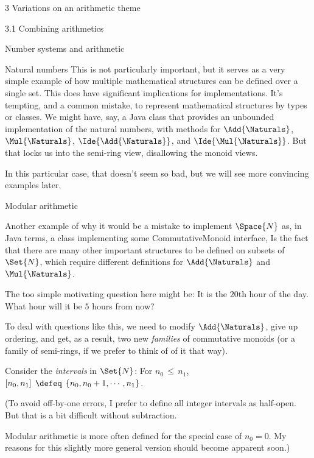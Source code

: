 \documentclass[12pt]{PalisadesLakesBook}
\begin{document}
\begin{plSection}{3 Variations on an arithmetic theme}
\begin{plSection}{3.1 Combining arithmetics}
\begin{plSection}{Number systems and arithmetic}
\begin{plSection}{Natural numbers}
This is not particularly important, but it serves as 
a very simple example
of how multiple mathematical structures can be defined
over a single set.
This does have significant implications for implementations.
It's tempting, and a common mistake, 
to represent mathematical structures by types or classes.
We might have, say, a Java class that provides an
unbounded implementation of the natural numbers,
with methods for $\Add{\Naturals}$, $\Mul{\Naturals}$, 
$\Ide{\Add{\Naturals}}$,
and $\Ide{\Mul{\Naturals}}$.
But that locks us into the semi-ring view,
disallowing the monoid views.

\TODO In this particular case, that doesn't seem so bad,
but we will see more convincing examples later.

\begin{plSection}{Modular arithmetic}

Another example of why it would be a mistake to implement
$\Space{N}$ as, in Java terms,
a class implementing some {\javaFont CommutativeMonoid} interface,
Is the fact that there are many other important structures
to be defined on subsets of $\Set{N}$, which require
different definitions for $\Add{\Naturals}$ and $\Mul{\Naturals}$.

The too simple motivating question here might be:
It is the $20$th hour of the day. What hour will it be $5$ hours
from now?

To deal with questions like this, we need to modify $\Add{\Naturals}$,
give up ordering, and get, as a result, two new \emph{families} of 
commutative monoids (or a family of semi-rings, 
if we prefer to think of of it that way).

Consider the \emph{intervals} in $\Set{N}$:
For $n_{0}\,\leq\, n_{1}$, 
$\left[ n_{0}, n_{1} \right] \; \defeq \;
\left\{ n_{0}, n_{0} + 1, \cdots , n_{1} \right\}$.

(\NOTE To avoid off-by-one errors, 
I prefer to define all integer intervals as half-open.
But that is a bit difficult without subtraction.

\NOTE Modular arithmetic is more often defined for the special 
case of $n_0=0$. My reasons for this slightly more general 
version should become apparent soon.)


\end{plSection}
\end{plSection}
\end{plSection}
\end{plSection}
\end{plSection}
\end{document}
